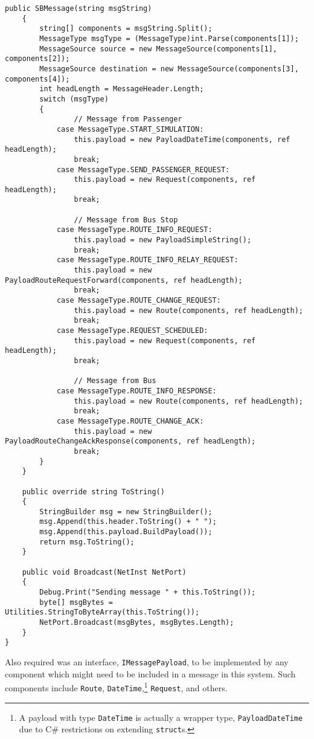\documentclass[runningheads]{llncs}
\begin{document}
\begin{lstlisting}[label=lst:sbmessage,caption={Source code for the \lstinline|SBMessage| class}]
    public SBMessage(string msgString)
    {
        string[] components = msgString.Split();
        MessageType msgType = (MessageType)int.Parse(components[1]);
        MessageSource source = new MessageSource(components[1], components[2]);
        MessageSource destination = new MessageSource(components[3], components[4]);
        int headLength = MessageHeader.Length;
        switch (msgType)
        {
                // Message from Passenger
            case MessageType.START_SIMULATION:
                this.payload = new PayloadDateTime(components, ref headLength);
                break;
            case MessageType.SEND_PASSENGER_REQUEST:
                this.payload = new Request(components, ref headLength);
                break;

                // Message from Bus Stop
            case MessageType.ROUTE_INFO_REQUEST:
                this.payload = new PayloadSimpleString();
                break;
            case MessageType.ROUTE_INFO_RELAY_REQUEST:
                this.payload = new PayloadRouteRequestForward(components, ref headLength);
                break;
            case MessageType.ROUTE_CHANGE_REQUEST:
                this.payload = new Route(components, ref headLength);
                break;
            case MessageType.REQUEST_SCHEDULED:
                this.payload = new Request(components, ref headLength);
                break;

                // Message from Bus
            case MessageType.ROUTE_INFO_RESPONSE:
                this.payload = new Route(components, ref headLength);
                break;
            case MessageType.ROUTE_CHANGE_ACK:
                this.payload = new PayloadRouteChangeAckResponse(components, ref headLength);
                break;
        }
    }

    public override string ToString()
    {
        StringBuilder msg = new StringBuilder();
        msg.Append(this.header.ToString() + " ");
        msg.Append(this.payload.BuildPayload());
        return msg.ToString();
    }

    public void Broadcast(NetInst NetPort)
    {
        Debug.Print("Sending message " + this.ToString());
        byte[] msgBytes = Utilities.StringToByteArray(this.ToString());
        NetPort.Broadcast(msgBytes, msgBytes.Length);
    }
}
\end{lstlisting}

Also required was an interface, \lstinline{IMessagePayload}, to be implemented by any component which might need to be included in a message in this system. Such components include \lstinline{Route}, \lstinline{DateTime},\footnote{A payload with type \lstinline|DateTime| is actually a wrapper type, \lstinline|PayloadDateTime| due to C\# restrictions on extending \lstinline|struct|s.} \lstinline{Request}, and others.
\end{document}

